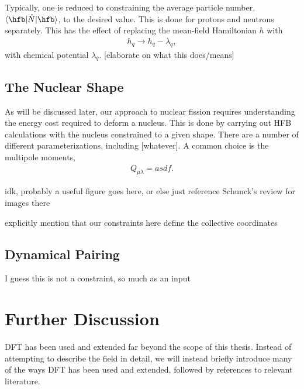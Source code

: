 \documentclass[../thesis.tex]{subfiles}
\begin{document}
Typically, one is reduced to constraining the average particle number, $\langle\hfb|\hat{N}|\hfb\rangle$, to the desired value. This is done for protons and neutrons separately. This has the effect of replacing the mean-field Hamiltonian $h$ with
\begin{align}
	h_q\to h_q-\lambda_q,
\end{align}
with chemical potential $\lambda_q$. [elaborate on what this does/means]

\subsection{The Nuclear Shape}
As will be discussed later, our approach to nuclear fission requires understanding the energy cost required to deform a nucleus. This is done by carrying out HFB calculations with the nucleus constrained to a given shape. There are a number of different parameterizations, including [whatever]. A common choice is the multipole moments,
\begin{align}
	Q_{\mu\lambda}=asdf.
\end{align}

idk, probably a useful figure goes here, or else just reference Schunck's review for images there

explicitly mention that our constraints here define the collective coordinates

\subsection{Dynamical Pairing}
I guess this is not a constraint, so much as an input

\section{Further Discussion}
DFT has been used and extended far beyond the scope of this thesis. Instead of attempting to describe the field in detail, we will instead briefly introduce many of the ways DFT has been used and extended, followed by references to relevant literature.
\end{document}
